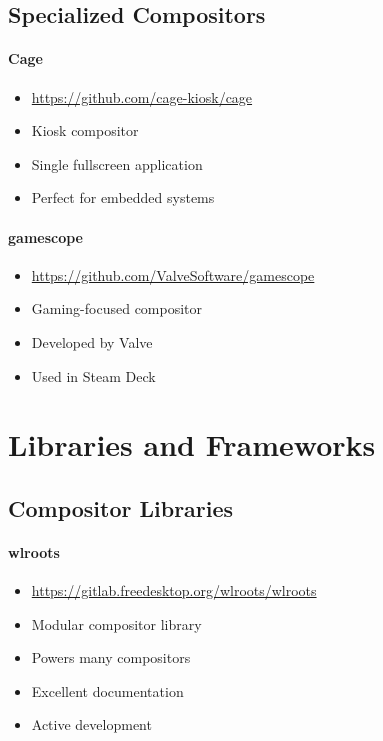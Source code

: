 \subsection{Specialized Compositors}

\paragraph{Cage}
\begin{itemize}
    \item \url{https://github.com/cage-kiosk/cage}
    \item Kiosk compositor
    \item Single fullscreen application
    \item Perfect for embedded systems
\end{itemize}

\paragraph{gamescope}
\begin{itemize}
    \item \url{https://github.com/ValveSoftware/gamescope}
    \item Gaming-focused compositor
    \item Developed by Valve
    \item Used in Steam Deck
\end{itemize}

\section{Libraries and Frameworks}

\subsection{Compositor Libraries}

\paragraph{wlroots}
\begin{itemize}
    \item \url{https://gitlab.freedesktop.org/wlroots/wlroots}
    \item Modular compositor library
    \item Powers many compositors
    \item Excellent documentation
    \item Active development
\end{itemize}

